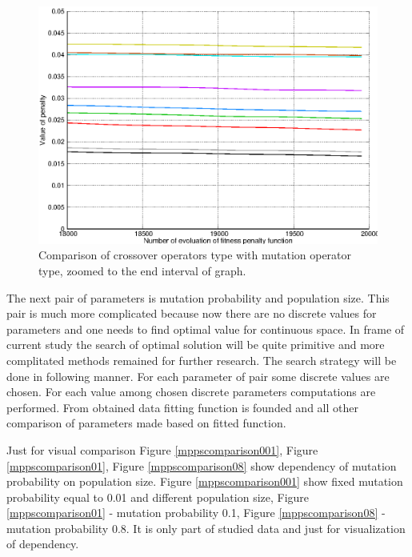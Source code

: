 \documentclass[12pt]{report}
\begin{document}
\begin{figure}
    \centering
    \includegraphics[width=5.0in]{operators_comparison_zoom}
    \caption{Comparison of crossover operators type with mutation operator type, zoomed to the end interval of graph.}
    \label{operatorcomparisonzoom}
\end{figure}

The next pair of parameters is mutation probability and population size. This pair is much more complicated because now there are no discrete values for parameters and one needs to find optimal value for continuous space. In frame of current study the search of optimal solution will be quite primitive and more complitated methods remained for further research. The search strategy will be done in following manner. For each parameter of pair some discrete values are chosen. For each value among chosen discrete parameters computations are performed. From obtained data fitting function is founded and all other comparison of parameters made based on fitted function.

Just for visual comparison Figure \ref{mppscomparison001}, Figure \ref{mppscomparison01}, Figure \ref{mppscomparison08} show dependency of mutation probability on population size. Figure \ref{mppscomparison001} show fixed mutation probability equal to 0.01 and different population size, Figure \ref{mppscomparison01} - mutation probability 0.1, Figure \ref{mppscomparison08} - mutation probability 0.8. It is only part of studied data and just for visualization of dependency.
\end{document}
